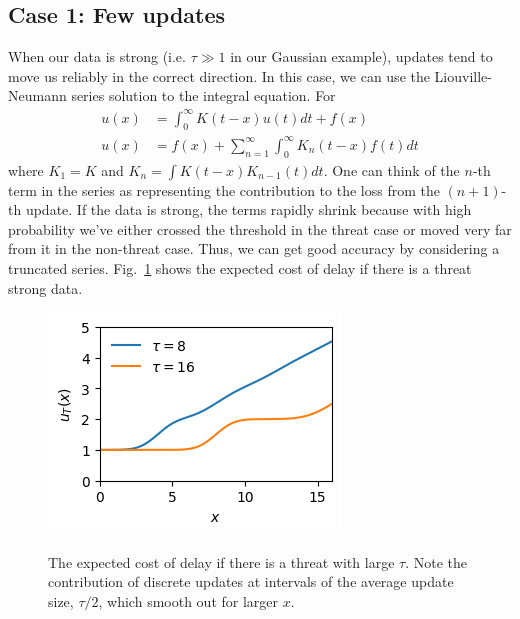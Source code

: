 \documentclass[12pt, letterpaper]{article}
\begin{document}
\subsection{Case 1: Few updates}

When our data is strong (i.e. $\tau \gg 1$ in our Gaussian example), updates tend to move us reliably in the correct direction.
In this case, we can use the Liouville-Neumann series solution to the integral equation.
For
\begin{align}
    u(x) &= \int_0^{\infty} K(t - x) u(t) dt + f(x) \\
    u(x) &= f(x) + \sum_{n=1}^{\infty} \int_0^{\infty} K_n(t - x) f(t) dt
    \label{eq:ln_series}
\end{align}
where $K_1 = K$ and $K_n = \int K(t - x) K_{n-1}(t) dt$.
One can think of the $n$-th term in the series as representing the contribution to the loss from the $(n+1)$-th update.
If the data is strong, the terms rapidly shrink because with high probability we've either crossed the threshold in the threat case or moved very far from it in the non-threat case.
Thus, we can get good accuracy by considering a truncated series.
Fig.~\ref{fig:large_updates} shows the expected cost of delay if there is a threat strong data.

\begin{figure}
    \centering
    \includegraphics{u_T}
    \label{fig:large_updates}
    \caption{The expected cost of delay if there is a threat with large $\tau$. Note the contribution of discrete updates at intervals of the average update size, $\tau / 2$, which smooth out for larger $x$.}
\end{figure}
\end{document}
